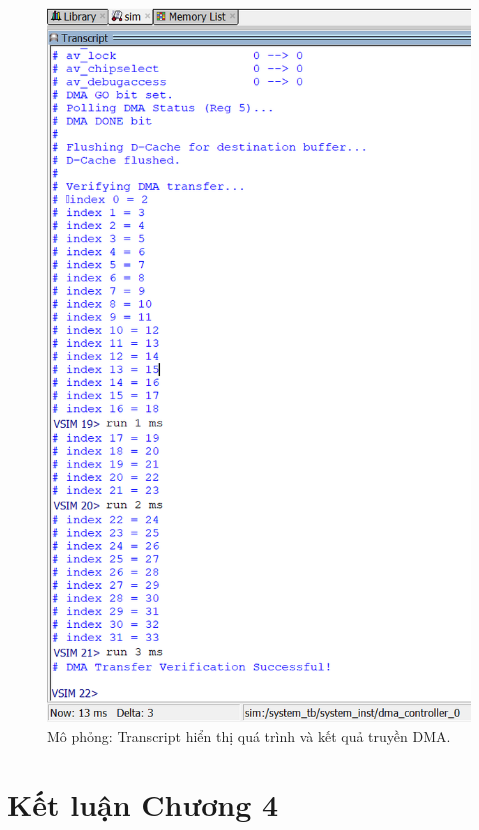 \begin{figure}[htbp]
    \centering
    \includegraphics[width=0.7\linewidth]{Images/04_07_TranscriptSimulationOutput.png} %
    \caption{Mô phỏng: Transcript hiển thị quá trình và kết quả truyền DMA.}
    \label{fig:04_07_TranscriptSimulationOutput}
\end{figure}

\FloatBarrier %

\section{Kết luận Chương 4}
\label{sec:chapter4_conclusion} %


